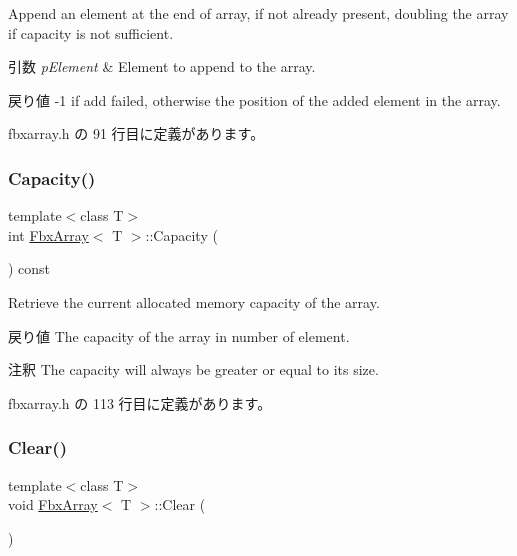 Append an element at the end of array, if not already present, doubling the array if capacity is not sufficient. 
\begin{DoxyParams}{引数}
{\em p\+Element} & Element to append to the array. \\
\hline
\end{DoxyParams}
\begin{DoxyReturn}{戻り値}
-\/1 if add failed, otherwise the position of the added element in the array. 
\end{DoxyReturn}


 fbxarray.\+h の 91 行目に定義があります。

\mbox{\label{class_fbx_array_a5f9ef2d46a1176800ca5a95b760ebaab}} 
\subsubsection{\texorpdfstring{Capacity()}{Capacity()}}
{\footnotesize\ttfamily template$<$class T$>$ \\
int \hyperlink{class_fbx_array}{Fbx\+Array}$<$ T $>$\+::Capacity (\begin{DoxyParamCaption}{ }\end{DoxyParamCaption}) const\hspace{0.3cm}{\ttfamily [inline]}}

Retrieve the current allocated memory capacity of the array. \begin{DoxyReturn}{戻り値}
The capacity of the array in number of element. 
\end{DoxyReturn}
\begin{DoxyRemark}{注釈}
The capacity will always be greater or equal to its size. 
\end{DoxyRemark}


 fbxarray.\+h の 113 行目に定義があります。

\mbox{\label{class_fbx_array_afeb2b8c53e6364a2d7a82b7a9f7de75f}} 
\subsubsection{\texorpdfstring{Clear()}{Clear()}}
{\footnotesize\ttfamily template$<$class T$>$ \\
void \hyperlink{class_fbx_array}{Fbx\+Array}$<$ T $>$\+::Clear (\begin{DoxyParamCaption}{ }\end{DoxyParamCaption})\hspace{0.3cm}{\ttfamily [inline]}}


